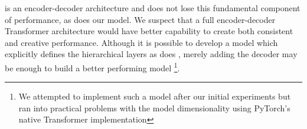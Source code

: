 \vnet{} is an encoder-decoder architecture and does not lose this fundamental component of performance, as does our model. We suspect that a full encoder-decoder Transformer architecture would have better capability to create both consistent and creative performance. Although it is possible to develop a model which explicitly defines the hierarchical layers as does \vnet{}, merely adding the decoder may be enough to build a better performing model%
\footnote{We attempted to implement such a model after our initial experiments but ran into practical problems with the model dimensionality using PyTorch's native Transformer implementation}. 
